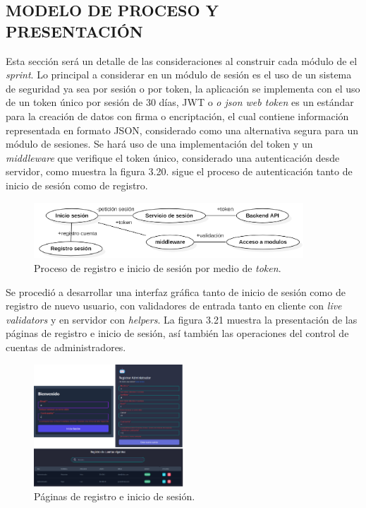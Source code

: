 \documentclass[letter, openright, 12pt]{book}
\begin{document}
\subsection{MODELO DE PROCESO Y PRESENTACIÓN}

Esta sección será un detalle de las consideraciones al construir cada módulo de el {\it sprint}. Lo principal a considerar en un módulo de sesión es el uso de un sistema de seguridad ya sea por sesión o por token, la aplicación se implementa con el uso de un token único por sesión de 30 días, JWT o { \it o json web token} es un estándar para la creación de datos con firma o encriptación, el cual contiene información representada en formato JSON, considerado como una alternativa segura para un módulo de sesiones. Se hará uso de una implementación del token y un {\it middleware } que verifique el token único, considerado una autenticación desde servidor, como muestra la figura 3.20. sigue el proceso de autenticación tanto de inicio de sesión como de registro. 


\begin{figure}[H]
\centering
\includegraphics[width=0.9\textwidth]{figura3_20}
 \caption{Proceso de registro e inicio de sesión por medio de {\it token}. }
\label{fig:figura3_20}
\end{figure}

Se procedió a desarrollar una interfaz gráfica tanto de inicio de sesión como de registro de nuevo usuario, con validadores de entrada tanto en cliente con {\it live validators} y en servidor con {\it helpers}. La figura 3.21 muestra la presentación de las páginas de registro e inicio de sesión, así también las operaciones del control de cuentas de administradores. 


\begin{figure}[H]
\centering
\includegraphics[width=0.5\textwidth]{figura3_21}
 \caption{Páginas de registro e inicio de sesión. }
\label{fig:figura3_21}
\end{figure}
\end{document}
